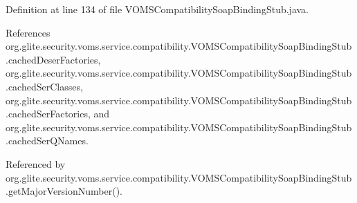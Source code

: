 Definition at line 134 of file VOMSCompatibilitySoapBindingStub.java.



References org.glite.security.voms.service.compatibility.VOMSCompatibilitySoapBindingStub.cachedDeserFactories, org.glite.security.voms.service.compatibility.VOMSCompatibilitySoapBindingStub.cachedSerClasses, org.glite.security.voms.service.compatibility.VOMSCompatibilitySoapBindingStub.cachedSerFactories, and org.glite.security.voms.service.compatibility.VOMSCompatibilitySoapBindingStub.cachedSerQNames.



Referenced by org.glite.security.voms.service.compatibility.VOMSCompatibilitySoapBindingStub.getMajorVersionNumber().


\begin{DoxyCode}
                                                                                 

\end{DoxyCode}
